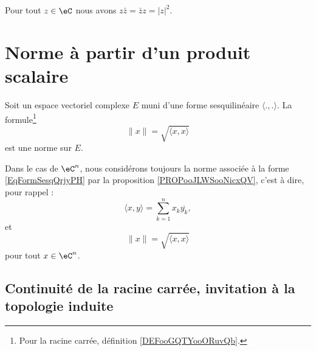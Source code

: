 \begin{lemma}   \label{LEMooONLNooXLNbtB}
	Pour tout \( z\in \eC\) nous avons \( z\bar z=\bar z z=| z |^2\).
\end{lemma}

\section{Norme à partir d'un produit scalaire}

\begin{proposition}            \label{PROPooJLWSooNicxQV}
	Soit un espace vectoriel complexe \( E\) muni d'une forme sesquilinéaire \( \langle ., .\rangle \). La formule\footnote{Pour la racine carrée, définition \ref{DEFooGQTYooORuvQb}.}
	\begin{equation}        \label{EQooZIXRooMGcsXY}
		\| x \|=  \sqrt{ \langle x, x\rangle }
	\end{equation}
	est une norme sur \( E\).
\end{proposition}

\begin{definition}      \label{DEFooGUXNooXwCsrq}
	Dans le cas de \( \eC^n\), nous considérons toujours la norme associée à la forme \eqref{EqFormSesqQrjyPH} par la proposition \ref{PROPooJLWSooNicxQV}, c'est à dire, pour rappel :
	\begin{equation}
		\langle x, y\rangle =\sum_{k=1}^nx_k\overline {y_k},
	\end{equation}
	et
	\begin{equation}
		\| x \|=  \sqrt{ \langle x, x\rangle }
	\end{equation}
	pour tout \( x\in \eC^n\).
\end{definition}

\subsection{Continuité de la racine carrée, invitation à la topologie induite}

